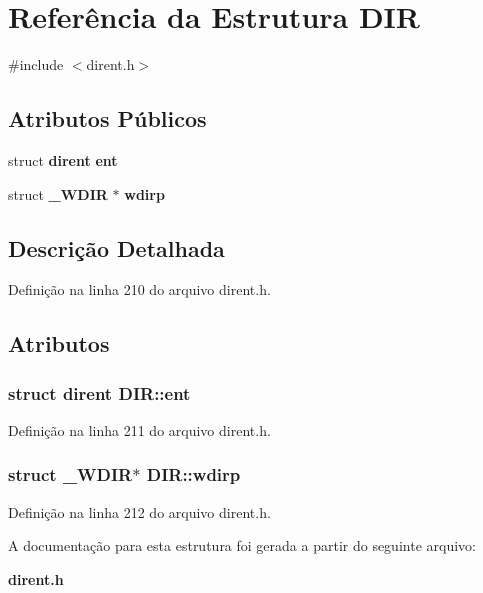\section{Referência da Estrutura D\+IR}
\label{struct_d_i_r}


{\ttfamily \#include $<$dirent.\+h$>$}

\subsection*{Atributos Públicos}
\begin{DoxyCompactItemize}
\item 
struct {\bf dirent} {\bf ent}
\item 
struct {\bf \+\_\+\+W\+D\+IR} $\ast$ {\bf wdirp}
\end{DoxyCompactItemize}


\subsection{Descrição Detalhada}


Definição na linha 210 do arquivo dirent.\+h.



\subsection{Atributos}
\subsubsection[{ent}]{\setlength{\rightskip}{0pt plus 5cm}struct {\bf dirent} D\+I\+R\+::ent}\label{struct_d_i_r_a59e9f5211cbb2f8e5b2807ccfdd2a7fc}


Definição na linha 211 do arquivo dirent.\+h.

\subsubsection[{wdirp}]{\setlength{\rightskip}{0pt plus 5cm}struct {\bf \+\_\+\+W\+D\+IR}$\ast$ D\+I\+R\+::wdirp}\label{struct_d_i_r_a29362d4a3d7f809d0f5418b26cac5d41}


Definição na linha 212 do arquivo dirent.\+h.



A documentação para esta estrutura foi gerada a partir do seguinte arquivo\+:\begin{DoxyCompactItemize}
\item 
{\bf dirent.\+h}\end{DoxyCompactItemize}
